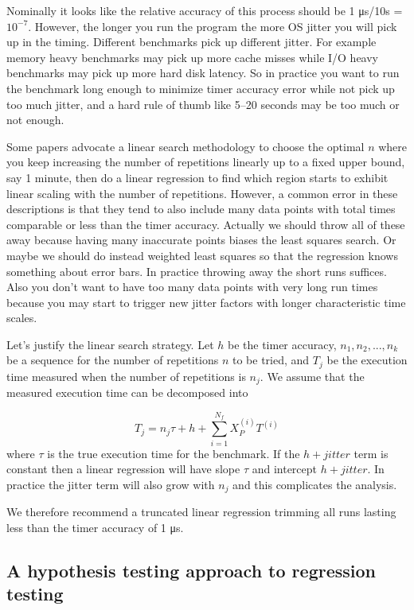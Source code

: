 \documentclass[conference]{IEEEtran}
\begin{document}
Nominally it looks like the relative accuracy of this process should be 1 μs/10s = $10^{-7}$. However, the longer you run the program the more OS jitter you will pick up in the timing. Different benchmarks pick up different jitter. For example memory heavy benchmarks may pick up more cache misses while I/O heavy benchmarks may pick up more hard disk latency. So in practice you want to run the benchmark long enough to minimize timer accuracy error while not pick up too much jitter, and a hard rule of thumb like 5--20 seconds may be too much or not enough.

Some papers
advocate a linear search methodology to choose the optimal $n$ where you keep increasing the number of repetitions linearly up to a fixed upper bound, say 1 minute, then do a linear regression to find which region starts to exhibit linear scaling with the number of repetitions. However, a common error in these descriptions is that they tend to also include many data points with total times comparable or less than the timer accuracy. Actually we should throw all of these away because having many inaccurate points biases the least squares search. Or maybe we should do instead weighted least squares so that the regression knows something about error bars. In practice throwing away the short runs suffices. Also you don't want to have too many data points with very long run times because you may start to trigger new jitter factors with longer characteristic time scales.

Let's justify the linear search strategy. Let $h$ be the timer accuracy, $n_1, n_2, ..., n_k$ be a sequence for the number of repetitions $n$ to be tried, and $T_j$ be the execution time measured when the number of repetitions is $n_j$. We assume that the measured execution time can be decomposed into

\begin{equation}
    T_j = n_j \tau + h + \sum_{i=1}^{N_f} X_P^{(i)} T^{(i)}
\end{equation}
%
where $\tau$ is the true execution time for the benchmark. If the $h + jitter$ term is constant then a linear regression will have slope $\tau$ and intercept $h + jitter$. In practice the jitter term will also grow with $n_j$ and this complicates the analysis.

We therefore recommend a truncated linear regression trimming all runs lasting less than the timer accuracy of 1 μs.



\subsection{A hypothesis testing approach to regression testing}
\end{document}
